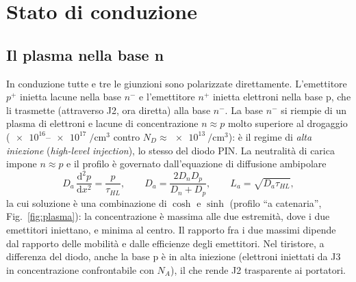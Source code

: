 \documentclass[11pt,a4paper]{article}
\newcommand{\dd}{\mathrm{d}}
\newcommand{\en}[1]{\emph{#1}}   %
\begin{document}
\section{Stato di conduzione}
\subsection{Il plasma nella base n}
In conduzione tutte e tre le giunzioni sono polarizzate direttamente. L'emettitore $p^+$ inietta lacune nella base $n^-$ e l'emettitore $n^+$ inietta elettroni nella base p, che li trasmette (attraverso J2, ora diretta) alla base $n^-$. La base $n^-$ si riempie di un plasma di elettroni e lacune di concentrazione $n\approx p$ molto superiore al drogaggio ($\numrange{e16}{e17}\;\unit{\per\cm\cubed}$ contro $N_D\approx\qty{e13}{\per\cm\cubed}$): è il regime di \emph{alta iniezione} (\en{high-level injection}), lo stesso del diodo PIN. La neutralità di carica impone $n\approx p$ e il profilo è governato dall'equazione di diffusione ambipolare
\begin{equation}
  D_a\,\frac{\dd^2 p}{\dd x^2} = \frac{p}{\tau_{HL}}, \qquad
  D_a = \frac{2D_nD_p}{D_n+D_p}, \qquad L_a = \sqrt{D_a\tau_{HL}},
  \label{eq:ambipolare}
\end{equation}
la cui soluzione è una combinazione di $\cosh$ e $\sinh$ (profilo ``a catenaria'', Fig.~\ref{fig:plasma}): la concentrazione è massima alle due estremità, dove i due emettitori iniettano, e minima al centro. Il rapporto fra i due massimi dipende dal rapporto delle mobilità e dalle efficienze degli emettitori. Nel tiristore, a differenza del diodo, anche la base p è in alta iniezione (elettroni iniettati da J3 in concentrazione confrontabile con $N_A$), il che rende J2 trasparente ai portatori.
\end{document}
